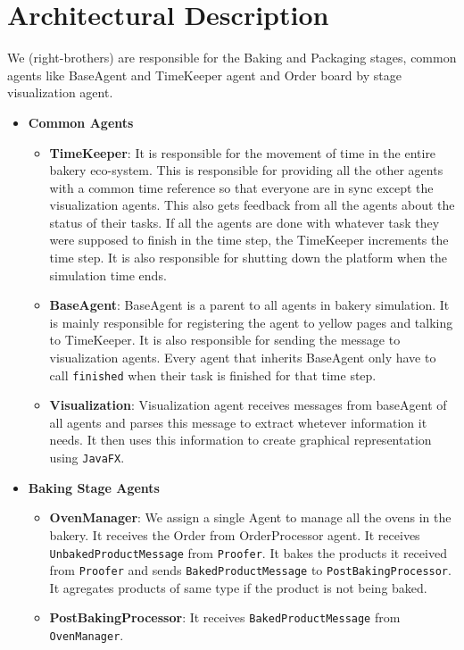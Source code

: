 \documentclass[12pt]{article}
\begin{document}
\section{Architectural Description}%
\label{sec:description}
We (right-brothers) are responsible for the Baking and Packaging stages, common agents like BaseAgent and TimeKeeper agent and Order board by stage visualization agent.
\begin{itemize}
\item \textbf{Common Agents}
\begin{itemize}
    \item \textbf{TimeKeeper}: 
 It is responsible for the movement of time in the entire bakery eco-system.
 This is responsible for providing all the other agents with a common time reference so that everyone are in sync except the visualization agents.
 This also gets feedback from all the agents about the status of their tasks.
 If all the agents are done with whatever task they were supposed to finish in the time step, the TimeKeeper increments the time step. 
 It is also responsible for shutting down the platform when the simulation time ends.
\item \textbf{BaseAgent}:
BaseAgent is a parent to all agents in bakery simulation.
It is mainly responsible for registering the agent to yellow pages and talking to TimeKeeper.
It is also responsible for sending the message to visualization agents.
Every agent that inherits BaseAgent only have to call \texttt{finished} when their task is finished for that time step.
\item \textbf{Visualization}:
Visualization agent receives messages from baseAgent of all agents and parses this message to extract whetever information it needs.
It then uses this information to create graphical representation using \texttt{JavaFX}.
\end{itemize}
\item \textbf{Baking Stage Agents}
\begin{itemize}
    \item \textbf{OvenManager}: 
 We assign a single Agent to manage all the ovens in the bakery.
 It receives the Order from OrderProcessor agent. 
 It receives \texttt{UnbakedProductMessage} from \texttt{Proofer}.
 It bakes the products it received from \texttt{Proofer} and sends \texttt{BakedProductMessage} to \texttt{PostBakingProcessor}.
 It agregates products of same type if the product is not being baked. 
    \item \textbf{PostBakingProcessor}:
 It receives \texttt{BakedProductMessage} from \texttt{OvenManager}.

\end{itemize}
\end{itemize}
\end{document}
